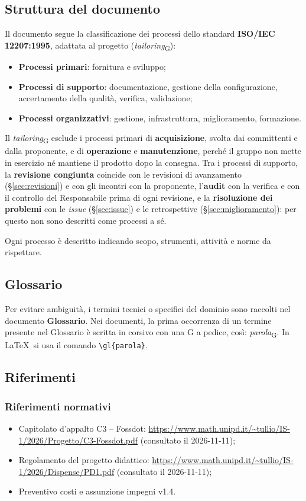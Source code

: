 \documentclass[12pt,a4paper]{article}
\newcommand{\tightlist}{\setlength{\itemsep}{1pt}\setlength{\parskip}{0pt}}
\newcommand{\gl}[1]{\emph{#1}\textsubscript{\scriptsize G}}
\begin{document}
\subsection{Struttura del documento}
Il documento segue la classificazione dei processi dello standard \textbf{ISO/IEC 12207:1995}, adattata al progetto (\gl{tailoring}):
\begin{itemize}
\tightlist
\item \textbf{Processi primari}: fornitura e sviluppo;
\item \textbf{Processi di supporto}: documentazione, gestione della configurazione, accertamento della qualità, verifica, validazione;
\item \textbf{Processi organizzativi}: gestione, infrastruttura, miglioramento, formazione.
\end{itemize}
Il \gl{tailoring} esclude i processi primari di \textbf{acquisizione}, svolta dai committenti e dalla proponente, e di \textbf{operazione} e \textbf{manutenzione}, perché il gruppo non mette in esercizio né mantiene il prodotto dopo la consegna. Tra i processi di supporto, la \textbf{revisione congiunta} coincide con le revisioni di avanzamento (§\ref{sec:revisioni}) e con gli incontri con la proponente, l'\textbf{audit} con la verifica e con il controllo del Responsabile prima di ogni revisione, e la \textbf{risoluzione dei problemi} con le \emph{issue} (§\ref{sec:issue}) e le retrospettive (§\ref{sec:miglioramento}): per questo non sono descritti come processi a sé.

Ogni processo è descritto indicando scopo, strumenti, attività e norme da rispettare.

\subsection{Glossario}
Per evitare ambiguità, i termini tecnici o specifici del dominio sono raccolti nel documento \textbf{Glossario}. Nei documenti, la prima occorrenza di un termine presente nel Glossario è scritta in corsivo con una G a pedice, così: \gl{parola}. In \LaTeX\ si usa il comando \texttt{\textbackslash gl\{parola\}}.

\subsection{Riferimenti}
\subsubsection{Riferimenti normativi}
\begin{itemize}
\tightlist
\item Capitolato d'appalto C3 -- Fossdot: \url{https://www.math.unipd.it/~tullio/IS-1/2026/Progetto/C3-Fossdot.pdf} (consultato il 2026-11-11);
\item Regolamento del progetto didattico: \url{https://www.math.unipd.it/~tullio/IS-1/2026/Dispense/PD1.pdf} (consultato il 2026-11-11);
\item Preventivo costi e assunzione impegni v1.4.
\end{itemize}
\end{document}
